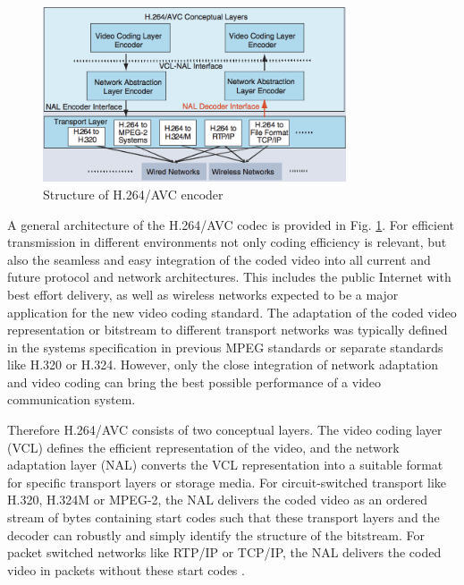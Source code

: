 \documentclass[letterpaper,12pt,titlepage,oneside,final]{report}
\begin{document}
            \begin{figure}[!h]
                \centering
                \includegraphics[width=0.8\textwidth]{h264struct}
                \caption{Structure of H.264/AVC encoder\cite{Ostermann2004}}
                \label{h264struct}
            \end{figure}

            A general architecture of the H.264/AVC codec is provided in Fig. \ref{h264struct}. For efficient transmission in different environments not only coding efficiency is relevant, but also the seamless and easy integration of the coded video into all current and future protocol and network architectures. This includes the public Internet with best effort delivery, as well as wireless networks expected to be a major application for the new video coding standard. The adaptation of the coded video representation or bitstream to different transport networks was typically defined in the systems specification in previous MPEG standards or separate standards like H.320 or H.324. However, only the close integration of network adaptation and video coding can bring the best possible performance of a video communication system. 

            Therefore H.264/AVC consists of two conceptual layers. The video coding layer (VCL) defines the efficient representation of the video, and the network adaptation layer (NAL) converts the VCL representation into a suitable format for specific transport layers or storage media. For circuit-switched transport like H.320, H.324M or MPEG-2, the NAL delivers the coded video as an ordered stream of bytes containing start codes such that these transport layers and the decoder can robustly and simply identify the structure of the bitstream. For packet switched networks like RTP/IP or TCP/IP, the NAL delivers the coded video in packets without these start codes \cite{Ostermann2004}.
\end{document}
